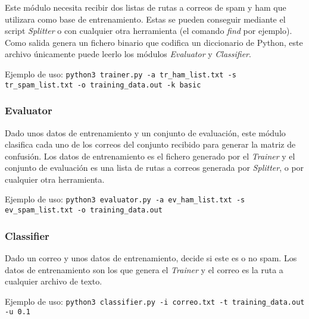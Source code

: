Este módulo necesita recibir dos listas de rutas a correos de spam y ham que
utilizara como base de entrenamiento. Estas se pueden conseguir mediante el
script \textit{Splitter} o con cualquier otra herramienta (el comando
\textit{find} por ejemplo). Como salida genera un fichero binario que codifica
un diccionario de Python, este archivo únicamente puede leerlo los módulos
\textit{Evaluator} y \textit{Classifier}.

Ejemplo de uso: \texttt{python3 trainer.py -a tr\_ham\_list.txt -s tr\_spam\_list.txt -o training\_data.out -k basic}

\subsubsection{Evaluator}

Dado unos datos de entrenamiento y un conjunto de evaluación, este módulo
clasifica cada uno de los correos del conjunto recibido para generar la matriz
de confusión. Los datos de entrenamiento es el fichero generado por el
\textit{Trainer} y el conjunto de evaluación es una lista de rutas a correos
generada por \textit{Splitter}, o por cualquier otra herramienta.

Ejemplo de uso\helpfn: \texttt{python3 evaluator.py -a ev\_ham\_list.txt -s ev\_spam\_list.txt -o training\_data.out}

\subsubsection{Classifier}

Dado un correo y unos datos de entrenamiento, decide si este es o no spam. Los
datos de entrenamiento son los que genera el \textit{Trainer} y el correo es
la ruta a cualquier archivo de texto.

Ejemplo de uso\helpfn: \texttt{python3 classifier.py -i correo.txt -t training\_data.out -u 0.1}
